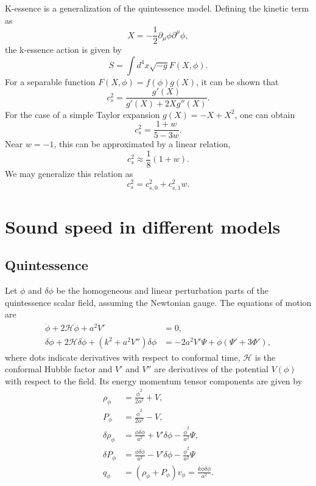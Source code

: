 \documentclass{article}
\begin{document}
K-essence is a generalization of the quintessence model. Defining the kinetic term as
\begin{equation}
    X = -\frac{1}{2}\partial_\mu\phi\partial^\mu\phi,
\end{equation}
the k-essence action is given by
\begin{equation}
    S = \int d^4x \sqrt{-g}F(X, \phi).
\end{equation}
For a separable function $F(X, \phi) = f(\phi)g(X)$, it can be shown that
\begin{equation}
    c_s^2 = \frac{g'(X)}{g'(X) + 2Xg''(X)}.
\end{equation}
For the case of a simple Taylor expansion $g(X) = -X + X^2$, one can obtain
\begin{equation}
    c_s^2 = \frac{1 + w}{5 - 3w}.
\end{equation}
Near $w = -1$, this can be approximated by a linear relation,
\begin{equation}
    c_s^2 \approx \frac{1}{8}(1 + w).
\end{equation}
We may generalize this relation as
\begin{equation}
    c_s^2 = c_{s,0}^2 + c_{s,1}^2 w.
\end{equation}

\section{Sound speed in different models}
\subsection{Quintessence}
Let $\phi$ and $\delta\phi$ be the homogeneous and linear perturbation parts of the quintessence scalar field, assuming the Newtonian gauge. The equations of motion are
\begin{align}
    \ddot\phi + 2\mathcal{H}\dot\phi + a^2V' &= 0, \\
    \delta\ddot{\phi} + 2\mathcal{H}\delta\dot\phi + (k^2 + a^2V'')\delta\phi &= -2a^2V'\Psi + \dot\phi(\Psi' + 3\Phi'),
\end{align}
where dots indicate derivatives with respect to conformal time, $\mathcal{H}$ is the conformal Hubble factor and $V'$ and $V''$ are derivatives of the potential $V(\phi)$ with respect to the field. Its energy momentum tensor components are given by
\begin{align}
    \rho_\phi &= \frac{\dot\phi^2}{2a^2} + V, \\
    P_\phi &= \frac{\dot\phi^2}{2a^2} - V, \\
    \delta\rho_\phi &= \frac{\dot\phi\delta\dot\phi}{a^2} + V'\delta\phi - \frac{\dot\phi^2}{a^2}\Psi, \\
    \delta P_\phi &= \frac{\dot\phi\delta\dot\phi}{a^2} - V'\delta\phi - \frac{\dot\phi^2}{a^2}\Psi \\
    q_\phi &= (\rho_\phi + P_\phi)v_\phi = \frac{k\dot\phi\delta\phi}{a^2}.
\end{align}
\end{document}
